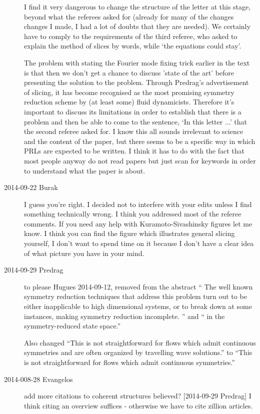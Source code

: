 \begin{description}
I find it very dangerous to change the structure
of the letter at this stage, beyond what the referees asked for
(already for many of the changes changes I made, I had a lot of doubts that they are needed).
We certainly have to comply to the requirements of the third referee,
who asked to explain the method of slices by words, while `the equations could stay'.

The problem with stating the Fourier mode fixing trick earlier in the text is that then we don't get
a chance to discuss 'state of the art' before presenting the solution to the problem.
Through Predrag's advertisement of slicing, it has become recognised as the most promising
symmetry reduction scheme by (at least some) fluid dynamicists. Therefore it's important to
discuss its limitations in order to establish that there is a problem and then be able to come to
the sentence, `In this letter ...' that the second referee asked for.
I know this all sounds irrelevant to science and the content of the paper,
but there seems to be a specific way in which PRLs are expected to be written. I think it has to
do with the fact that most people anyway do not read papers but just scan for keywords in order to
understand what the paper is about.

\item[2014-09-22 Burak] I guess you're right. I decided not to interfere with
your edits unless I find something technically wrong. I think you addressed
most of the  referee comments. If you need any help with Kuramoto-Sivashinsky
figures let me know. I think you can find the figure which illustrates general
slicing yourself, I don't want to spend time on it because I don't have a clear
idea of what picture you have in your mind.

\item[2014-09-29 Predrag]
to please Hugues {2014-09-12}, removed from the abstract
 ``
The well known symmetry reduction techniques that address this
problem turn out to be either inapplicable to high dimensional systems,
or to break down at some instances, making symmetry reduction incomplete.
'' and ``
 in the symmetry-reduced state space.''

Also changed
``This is not straightforward for flows which admit continuous symmetries
and are often organized by travelling wave solutions.'' to ``This is not
straightforward for flows which admit continuous symmetries.''

\item[2014-008-28 Evangelos] add more citations to coherent structures
believed? [2014-09-29 Predrag] I think citing an overview
suffices - otherwise we have to cite zillion articles.


\end{description}
